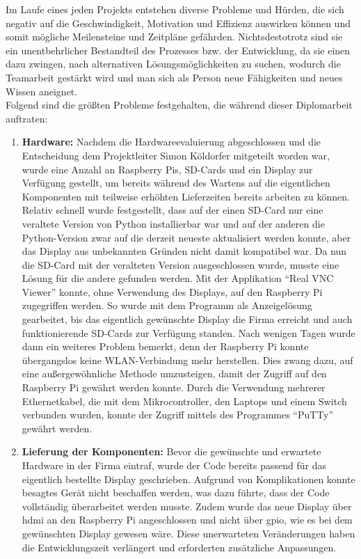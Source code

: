 Im Laufe eines jeden Projekts entstehen diverse Probleme und Hürden, die sich negativ auf die Geschwindigkeit, Motivation und Effizienz auswirken können und somit mögliche Meilensteine und Zeitpläne gefährden. Nichtsdestotrotz sind sie ein unentbehrlicher Bestandteil des Prozesses bzw. der Entwicklung, da sie einen dazu zwingen, nach alternativen Lösungsmöglichkeiten zu suchen, wodurch die Teamarbeit gestärkt wird und man sich als Person neue Fähigkeiten und neues Wissen aneignet.\\ Folgend sind die größten Probleme festgehalten, die während dieser Diplomarbeit auftraten:

\begin{enumerate}
	\item \textbf{Hardware: }Nachdem die Hardwareevaluierung abgeschlossen und die Entscheidung dem Projektleiter Simon Köldorfer mitgeteilt worden war, wurde eine Anzahl an Raspberry Pis, SD-Cards und ein Display zur Verfügung gestellt, um bereits während des Wartens auf die eigentlichen Komponenten mit teilweise erhöhten Lieferzeiten bereits arbeiten zu können. Relativ schnell wurde festgestellt, dass auf der einen SD-Card nur eine veraltete Version von Python installierbar war und auf der anderen die Python-Version zwar auf die derzeit neueste aktualisiert werden konnte, aber das Display aus unbekannten Gründen nicht damit kompatibel war. Da nun die SD-Card mit der veralteten Version ausgeschlossen wurde, musste eine Lösung für die andere gefunden werden. Mit der Applikation \enquote{Real VNC Viewer} konnte, ohne Verwendung des Displays, auf den Raspberry Pi zugegriffen werden. So wurde mit dem Programm als Anzeigelösung gearbeitet, bis das eigentlich gewünschte Display die Firma erreicht und auch funktionierende SD-Cards zur Verfügung standen. Nach wenigen Tagen wurde dann ein weiteres Problem bemerkt, denn der Raspberry Pi konnte übergangslos keine WLAN-Verbindung mehr herstellen. Dies zwang dazu, auf eine außergewöhnliche Methode umzusteigen, damit der Zugriff auf den Raspberry Pi gewährt werden konnte. Durch die Verwendung mehrerer Ethernetkabel, die mit dem Mikrocontroller, den Laptops und einem Switch verbunden wurden, konnte der Zugriff mittels des Programmes \enquote{PuTTy} gewährt werden.
	\item \textbf{Lieferung der Komponenten: } Bevor die gewünschte und erwartete Hardware in der Firma eintraf, wurde der Code bereits passend für das eigentlich bestellte Display geschrieben. Aufgrund von Komplikationen konnte besagtes Gerät nicht beschaffen werden, was dazu führte, dass der Code vollständig überarbeitet werden musste. Zudem wurde das neue Display über \gls{hdmi} an den Raspberry Pi angeschlossen und nicht über \gls{gpio}, wie es bei dem gewünschten Display gewesen wäre. Diese unerwarteten Veränderungen haben die Entwicklungszeit verlängert und erforderten zusätzliche Anpassungen.

\end{enumerate}
